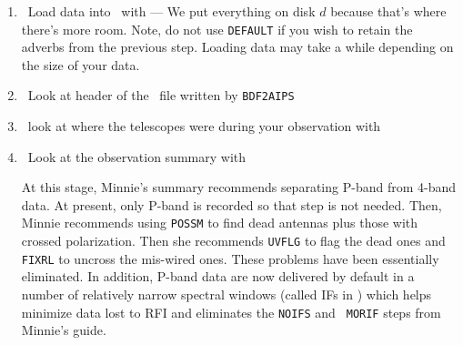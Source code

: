 \begin{enumerate}
\item\ Load data into \AIPS\ with {\tt {}} --- We put
  everything on disk $d$ because that's where there's more room.
  Note, do not use {\tt DEFAULT} if you wish to retain the adverbs
  from the previous step.  Loading data may take a while depending on
  the size of your data.

\item\ Look at header of the \AIPS\ file written by {\tt BDF2AIPS}

\item\ look at where the telescopes were during your observation with
     {\tt {}}

\item\ Look at the observation summary with {\tt {}}

At this stage, Minnie's summary recommends separating P-band from
4-band data.  At present, only P-band is recorded so that step is not
needed.  Then, Minnie recommends using {\tt POSSM} to find dead
antennas plus those with crossed polarization.  Then she recommends
{\tt UVFLG} to flag the dead ones and {\tt FIXRL} to uncross the
mis-wired ones.  These problems have been essentially eliminated.
In addition, P-band data are now delivered by default in a number of
relatively narrow spectral windows (called IFs in \AIPS) which helps
minimize data lost to RFI and eliminates the {\tt NOIFS} and {\tt
  MORIF} steps from Minnie's guide.


\end{enumerate}
